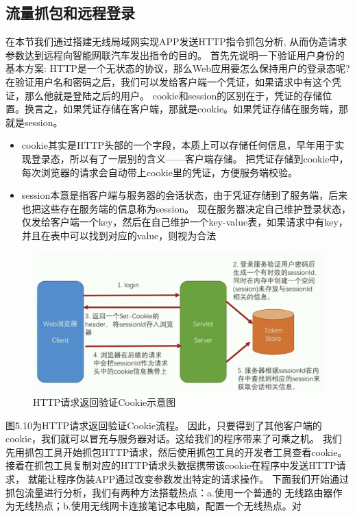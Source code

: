 \subsection{流量抓包和远程登录}
在本节我们通过搭建无线局域网实现APP发送HTTP指令抓包分析, 从而伪造请求参数达到远程向智能网联汽车发出指令的目的。
首先先说明一下验证用户身份的基本方案: HTTP是一个无状态的协议，那么Web应用要怎么保持用户的登录态呢?
在验证用户名和密码之后，我们可以发给客户端一个凭证，如果请求中有这个凭证，那么他就是登陆之后的用户。
cookie和session的区别在于，凭证的存储位置。换言之，如果凭证存储在客户端，那就是cookie。如果凭证存储在服务端，那就是session。
\begin{itemize}
  \item cookie其实是HTTP头部的一个字段，本质上可以存储任何信息，早年用于实现登录态，所以有了一层别的含义——客户端存储。
  把凭证存储到cookie中，每次浏览器的请求会自动带上cookie里的凭证，方便服务端校验。
  \item session本意是指客户端与服务器的会话状态，由于凭证存储到了服务端，后来也把这些存在服务端的信息称为session。
  现在服务器决定自己维护登录状态，仅发给客户端一个key，然后在自己维护一个key-value表，如果请求中有key，并且在表中可以找到对应的value，则视为合法
\end{itemize}
\begin{figure}
  \centering
  \includegraphics[scale=0.5]{resources/img/i25.png}
  \caption{HTTP请求返回验证Cookie示意图}
\end{figure} 
图5.10为HTTP请求返回验证Cookie流程。
因此，只要得到了其他客户端的cookie，我们就可以冒充与服务器对话。这给我们的程序带来了可乘之机。
我们先用抓包工具开始抓包HTTP请求，然后使用抓包工具的开发者工具查看cookie。
接着在抓包工具复制对应的HTTP请求头数据携带该cookie在程序中发送HTTP请求，
就能让程序伪装APP通过改变参数发出特定的请求操作。
\newline
下面我们开始通过抓包流量进行分析，我们有两种方法搭载热点：a.使用一个普通的
无线路由器作为无线热点；b.使用无线网卡连接笔记本电脑，配置一个无线热点。对
